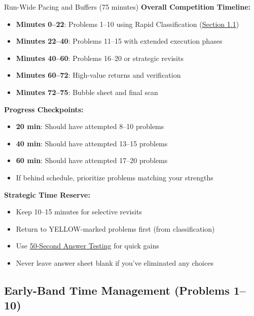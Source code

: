 \documentclass{article}
\begin{document}
\begin{timebox}{Run-Wide Pacing and Buffers (75 minutes)}
\textbf{Overall Competition Timeline:}
\begin{itemize}[nosep]
\item \textbf{Minutes 0--22}: Problems 1--10 using Rapid Classification (\hyperlink{classify-15}{Section 1.1})
\item \textbf{Minutes 22--40}: Problems 11--15 with extended execution phases
\item \textbf{Minutes 40--60}: Problems 16--20 or strategic revisits
\item \textbf{Minutes 60--72}: High-value returns and verification
\item \textbf{Minutes 72--75}: Bubble sheet and final scan
\end{itemize}

\textbf{Progress Checkpoints:}
\begin{itemize}[nosep]
\item \textbf{20 min}: Should have attempted 8--10 problems
\item \textbf{40 min}: Should have attempted 13--15 problems
\item \textbf{60 min}: Should have attempted 17--20 problems
\item If behind schedule, prioritize problems matching your strengths
\end{itemize}

\textbf{Strategic Time Reserve:}
\begin{itemize}[nosep]
\item Keep 10--15 minutes for selective revisits
\item Return to YELLOW-marked problems first (from classification)
\item Use \hyperlink{answer-test-50}{50-Second Answer Testing} for quick gains
\item Never leave answer sheet blank if you've eliminated any choices
\end{itemize}
\end{timebox}

\subsection{Early-Band Time Management (Problems 1--10)}
\end{document}
